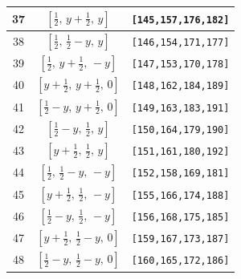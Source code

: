 \documentclass[fleqn,8pt]{jsarticle}
\begin{document}
\begin{longtable}{ccc}
37 & $\left[ \frac{1}{2},\, y + \frac{1}{2},\, y \right]$ & {\tt [145,157,176,182]} \\ \hline
38 & $\left[ \frac{1}{2},\, \frac{1}{2} - y,\, y \right]$ & {\tt [146,154,171,177]} \\ \hline
39 & $\left[ \frac{1}{2},\, y + \frac{1}{2},\, - y \right]$ & {\tt [147,153,170,178]} \\ \hline
40 & $\left[ y + \frac{1}{2},\, y + \frac{1}{2},\, 0 \right]$ & {\tt [148,162,184,189]} \\ \hline
41 & $\left[ \frac{1}{2} - y,\, y + \frac{1}{2},\, 0 \right]$ & {\tt [149,163,183,191]} \\ \hline
42 & $\left[ \frac{1}{2} - y,\, \frac{1}{2},\, y \right]$ & {\tt [150,164,179,190]} \\ \hline
43 & $\left[ y + \frac{1}{2},\, \frac{1}{2},\, y \right]$ & {\tt [151,161,180,192]} \\ \hline
44 & $\left[ \frac{1}{2},\, \frac{1}{2} - y,\, - y \right]$ & {\tt [152,158,169,181]} \\ \hline
45 & $\left[ y + \frac{1}{2},\, \frac{1}{2},\, - y \right]$ & {\tt [155,166,174,188]} \\ \hline
46 & $\left[ \frac{1}{2} - y,\, \frac{1}{2},\, - y \right]$ & {\tt [156,168,175,185]} \\ \hline
47 & $\left[ y + \frac{1}{2},\, \frac{1}{2} - y,\, 0 \right]$ & {\tt [159,167,173,187]} \\ \hline
48 & $\left[ \frac{1}{2} - y,\, \frac{1}{2} - y,\, 0 \right]$ & {\tt [160,165,172,186]} \\
\end{longtable}
\renewcommand{\arraystretch}{1.2}
\end{document}
